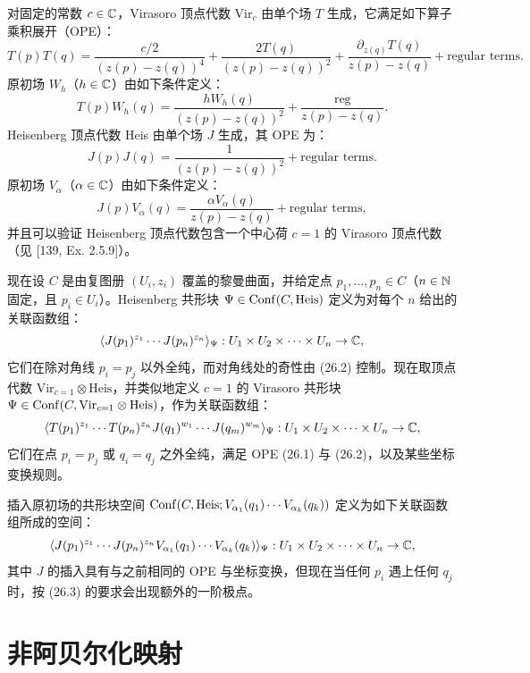 对固定的常数 $c\in\mathbb{C}$，Virasoro 顶点代数 $\mathrm{Vir}_c$ 由单个场 $T$ 生成，它满足如下算子乘积展开（OPE）：
\begin{equation}
T(p)T(q)=\frac{c/2}{(z(p)-z(q))^4}+\frac{2T(q)}{(z(p)-z(q))^2}+\frac{\partial_{z(q)}T(q)}{z(p)-z(q)}+\text{regular terms}.
\tag{26.1}
\end{equation}
原初场 $W_h$（$h\in\mathbb{C}$）由如下条件定义：
\[
T(p)W_h(q)=\frac{hW_h(q)}{(z(p)-z(q))^2}+\frac{\mathrm{reg}}{z(p)-z(q)}.
\]
Heisenberg 顶点代数 Heis 由单个场 $J$ 生成，其 OPE 为：
\begin{equation}
J(p)J(q)=\frac{1}{(z(p)-z(q))^2}+\text{regular terms}.
\tag{26.2}
\end{equation}
原初场 $V_\alpha$（$\alpha\in\mathbb{C}$）由如下条件定义：
\begin{equation}
J(p)V_\alpha(q)=\frac{\alpha V_\alpha(q)}{z(p)-z(q)}+\text{regular terms},
\tag{26.3}
\end{equation}
并且可以验证 Heisenberg 顶点代数包含一个中心荷 $c=1$ 的 Virasoro 顶点代数（见 [139, Ex. 2.5.9]）。

现在设 $C$ 是由复图册 $(U_i,z_i)$ 覆盖的黎曼曲面，并给定点 $p_1,\dots,p_n\in C$（$n\in\mathbb{N}$ 固定，且 $p_i\in U_i$）。Heisenberg 共形块 $\Psi\in\operatorname{Conf}(C,\mathrm{Heis})$ 定义为对每个 $n$ 给出的关联函数组：
\[
\langle J(p_1)^{z_1}\cdots J(p_n)^{z_n}\rangle_\Psi: U_1\times U_2\times\cdots\times U_n\to\mathbb{C},
\]
它们在除对角线 $p_i=p_j$ 以外全纯，而对角线处的奇性由 (26.2) 控制。现在取顶点代数 $\mathrm{Vir}_{c=1}\otimes\mathrm{Heis}$，并类似地定义 $c=1$ 的 Virasoro 共形块 $\Psi\in\operatorname{Conf}(C,\mathrm{Vir}_{c=1}\otimes\mathrm{Heis})$，作为关联函数组：
\[
\langle T(p_1)^{z_1}\cdots T(p_n)^{z_n}J(q_1)^{w_1}\cdots J(q_m)^{w_m}\rangle_\Psi: U_1\times U_2\times\cdots\times U_n\to\mathbb{C},
\]
它们在点 $p_i=p_j$ 或 $q_i=q_j$ 之外全纯，满足 OPE (26.1) 与 (26.2)，以及某些坐标变换规则。

插入原初场的共形块空间 $\operatorname{Conf}(C,\mathrm{Heis};V_{\alpha_1}(q_1)\cdots V_{\alpha_k}(q_k))$ 定义为如下关联函数组所成的空间：
\[
\langle J(p_1)^{z_1}\cdots J(p_n)^{z_n}V_{\alpha_1}(q_1)\cdots V_{\alpha_k}(q_k)\rangle_\Psi: U_1\times U_2\times\cdots\times U_n\to\mathbb{C},
\]
其中 $J$ 的插入具有与之前相同的 OPE 与坐标变换，但现在当任何 $p_i$ 遇上任何 $q_j$ 时，按 (26.3) 的要求会出现额外的一阶极点。

\section{非阿贝尔化映射}

